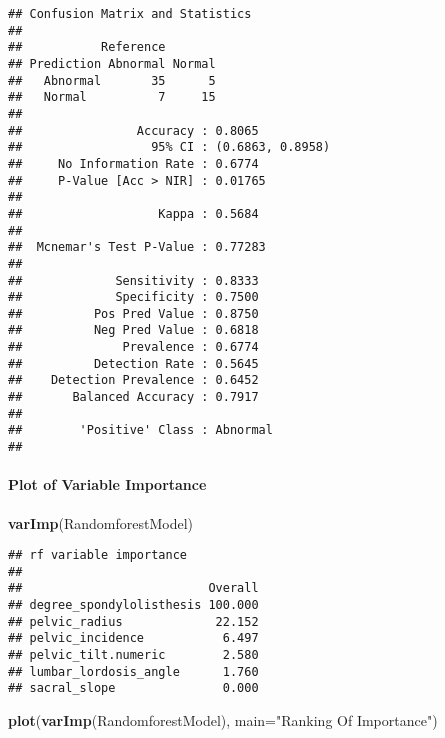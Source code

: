 \documentclass[
]{article}
\newenvironment{Shaded}{\begin{snugshade}}{\end{snugshade}}
\newcommand{\DataTypeTok}[1]{\textcolor[rgb]{0.13,0.29,0.53}{#1}}
\newcommand{\KeywordTok}[1]{\textcolor[rgb]{0.13,0.29,0.53}{\textbf{#1}}}
\newcommand{\NormalTok}[1]{#1}
\newcommand{\StringTok}[1]{\textcolor[rgb]{0.31,0.60,0.02}{#1}}
\begin{document}
\begin{verbatim}
## Confusion Matrix and Statistics
## 
##           Reference
## Prediction Abnormal Normal
##   Abnormal       35      5
##   Normal          7     15
##                                           
##                Accuracy : 0.8065          
##                  95% CI : (0.6863, 0.8958)
##     No Information Rate : 0.6774          
##     P-Value [Acc > NIR] : 0.01765         
##                                           
##                   Kappa : 0.5684          
##                                           
##  Mcnemar's Test P-Value : 0.77283         
##                                           
##             Sensitivity : 0.8333          
##             Specificity : 0.7500          
##          Pos Pred Value : 0.8750          
##          Neg Pred Value : 0.6818          
##              Prevalence : 0.6774          
##          Detection Rate : 0.5645          
##    Detection Prevalence : 0.6452          
##       Balanced Accuracy : 0.7917          
##                                           
##        'Positive' Class : Abnormal        
## 
\end{verbatim}

\hypertarget{plot-of-variable-importance}{%
\paragraph{Plot of Variable
Importance}\label{plot-of-variable-importance}}

\begin{Shaded}
\begin{Highlighting}[]
\KeywordTok{varImp}\NormalTok{(RandomforestModel)}
\end{Highlighting}
\end{Shaded}

\begin{verbatim}
## rf variable importance
## 
##                          Overall
## degree_spondylolisthesis 100.000
## pelvic_radius             22.152
## pelvic_incidence           6.497
## pelvic_tilt.numeric        2.580
## lumbar_lordosis_angle      1.760
## sacral_slope               0.000
\end{verbatim}

\begin{Shaded}
\begin{Highlighting}[]
\KeywordTok{plot}\NormalTok{(}\KeywordTok{varImp}\NormalTok{(RandomforestModel), }\DataTypeTok{main=}\StringTok{"Ranking Of Importance"}\NormalTok{)}
\end{Highlighting}
\end{Shaded}
\end{document}

